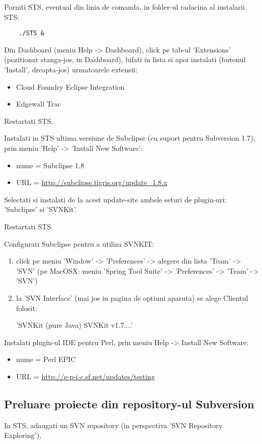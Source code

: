 Porniti STS, eventual din linia de comanda, in folder-ul radacina al instalarii STS:
\begin{lstlisting}	
	./STS &
\end{lstlisting}

Din Dashboard (meniu Help -> Dashboard), click pe tab-ul 'Extensions'
(pozitionat stanga-jos, in Dashboard), bifati in lista si apoi instalati
(butonul 'Install', dreapta-jos) urmatoarele extensii:
\begin{itemize}
\item
Cloud Foundry Eclipse Integration
\item
Edgewall Trac
\end{itemize} 

Restartati STS.

Instalati in STS ultima versiune de Subclipse (cu suport pentru Subversion 1.7),
prin meniu 'Help' -> 'Install New Software':
\begin{itemize}
\item 
nume = Subclipse 1.8
\item
URL = \url{http://subclipse.tigris.org/update_1.8.x}
\end{itemize}

Selectati si instalati de la acest update-site ambele seturi de plugin-uri:
'Subclipse' si 'SVNKit'.

Restartati STS.

Configurati Subclipse pentru a utiliza SVNKIT:
\begin{enumerate}
\item 
click pe meniu 'Window' -> 'Preferences' -> alegere din lista 'Team' -> 'SVN'
(pe MacOSX: meniu 'Spring Tool Suite' -> 'Preferences' -> 'Team' -> 'SVN')
\item
la 'SVN Interface' (mai jos in pagina de optiuni aparuta) se alege Clientul
folosit:

'SVNKit (pure Java) SVNKit v1.7....'
\end{enumerate}

Instalati plugin-ul IDE pentru Perl, prin meniu Help -> Install
New Software:
\begin{itemize}
\item 
nume = Perl EPIC
\item
URL = \url{http://e-p-i-c.sf.net/updates/testing}
\end{itemize}

\subsection{Preluare proiecte din repository-ul Subversion}
In STS, adaugati un SVN repository (in perspectiva 'SVN Repository
Exploring'), 

